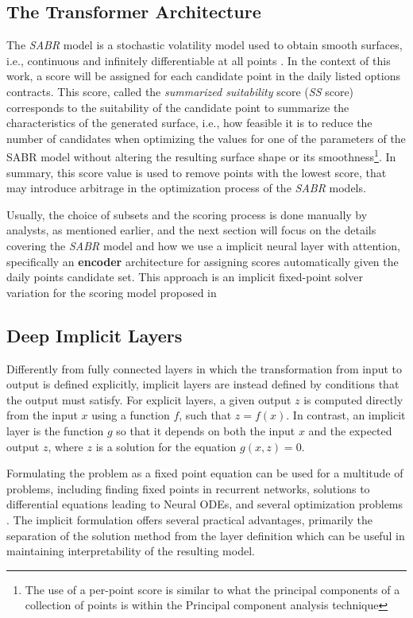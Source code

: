 \subsection{The Transformer Architecture}
The \textit{SABR} model is a stochastic volatility model used to obtain smooth surfaces, i.e., continuous and infinitely differentiable at all points \citep{Hagan2015}. In the context of this work, a score will be assigned for each candidate point in the daily listed options contracts. This score, called the \textit{summarized suitability} score (\textit{SS} score) corresponds to the suitability of the candidate point to summarize the characteristics of the generated surface, i.e., how feasible it is to reduce the number of candidates when optimizing the values for one of the parameters of the SABR model without altering the resulting surface shape or its smoothness\footnote{The use of a per-point score is similar to what the principal components of a collection of points is within the Principal component analysis technique}. In summary, this score value is used to remove points with the lowest score, that may introduce arbitrage in the optimization process of the \textit{SABR} models.

Usually, the choice of subsets and the scoring process is done manually by analysts, as mentioned earlier, and the next section will focus on the details covering the \textit{SABR} model and how we use a implicit neural layer with attention, specifically an \textbf{encoder} architecture for assigning scores automatically given the daily points candidate set. This approach is an implicit fixed-point solver variation for the scoring model proposed in \citep{Kim2021}

\subsection{Deep Implicit Layers}
Differently from fully connected layers in which the transformation from input to output is defined explicitly, implicit layers are instead defined by conditions that the output must satisfy. For explicit layers, a given output $z$ is computed directly from the input $x$ using a function $f$, such that $z = f(x)$. In contrast, an implicit layer is the function $g$ so that it depends on both the input $x$ and the expected output $z$, where $z$ is a solution for the equation $g(x, z) = 0$.

Formulating the problem as a fixed point equation can be used for a multitude of problems, including finding fixed points in recurrent networks, solutions to differential equations leading to Neural ODEs, and several optimization problems \citep{Chen2019}. The implicit formulation offers several practical advantages, primarily the separation of the solution method from the layer definition which can be useful in maintaining interpretability of the resulting model\citep{Kawaguchi2021}.

